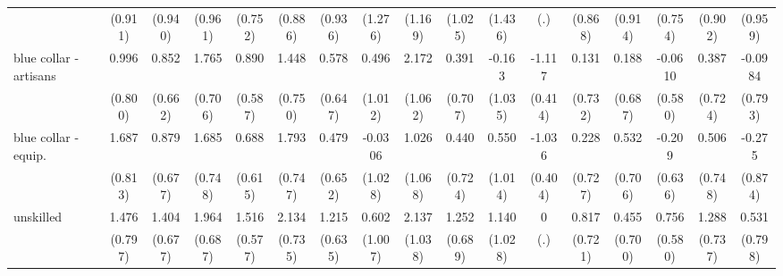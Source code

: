 {\begin{tabular}{l*{16}{c}}
                    &     (0.911)         &     (0.940)         &     (0.961)         &     (0.752)         &     (0.886)         &     (0.936)         &     (1.276)         &     (1.169)         &     (1.025)         &     (1.436)         &         (.)         &     (0.868)         &     (0.914)         &     (0.754)         &     (0.902)         &     (0.959)         \\
[1em]
blue collar - artisans&       0.996         &       0.852         &       1.765\sym{*}  &       0.890         &       1.448         &       0.578         &       0.496         &       2.172\sym{*}  &       0.391         &      -0.163         &      -1.117\sym{**} &       0.131         &       0.188         &     -0.0610         &       0.387         &     -0.0984         \\
                    &     (0.800)         &     (0.662)         &     (0.706)         &     (0.587)         &     (0.750)         &     (0.647)         &     (1.012)         &     (1.062)         &     (0.707)         &     (1.035)         &     (0.414)         &     (0.732)         &     (0.687)         &     (0.580)         &     (0.724)         &     (0.793)         \\
[1em]
blue collar - equip.&       1.687\sym{*}  &       0.879         &       1.685\sym{*}  &       0.688         &       1.793\sym{*}  &       0.479         &     -0.0306         &       1.026         &       0.440         &       0.550         &      -1.036\sym{*}  &       0.228         &       0.532         &      -0.209         &       0.506         &      -0.275         \\
                    &     (0.813)         &     (0.677)         &     (0.748)         &     (0.615)         &     (0.747)         &     (0.652)         &     (1.028)         &     (1.068)         &     (0.724)         &     (1.014)         &     (0.404)         &     (0.727)         &     (0.706)         &     (0.636)         &     (0.748)         &     (0.874)         \\
[1em]
unskilled           &       1.476         &       1.404\sym{*}  &       1.964\sym{**} &       1.516\sym{**} &       2.134\sym{**} &       1.215         &       0.602         &       2.137\sym{*}  &       1.252         &       1.140         &           0         &       0.817         &       0.455         &       0.756         &       1.288         &       0.531         \\
                    &     (0.797)         &     (0.677)         &     (0.687)         &     (0.577)         &     (0.735)         &     (0.635)         &     (1.007)         &     (1.038)         &     (0.689)         &     (1.028)         &         (.)         &     (0.721)         &     (0.700)         &     (0.580)         &     (0.737)         &     (0.798)         \\

\end{tabular}}
